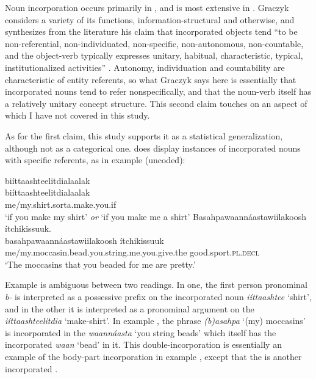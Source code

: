 \documentclass[output=paper]{LSP/langsci}
\begin{document}
Noun incorporation occurs primarily in , and is most extensive in . Graczyk considers a variety of its functions, information-structural and otherwise, and synthesizes from the literature his claim that incorporated objects tend “to be non-referential, non-individuated, non-specific, non-autonomous, non-countable, and the object-verb  typically expresses unitary, habitual, characteristic, typical, institutionalized activities” \citeyearpar[244]{Graczyk1991a}. Autonomy, individuation and countability are characteristic of entity referents, so what Graczyk says here is essentially that incorporated nouns tend to refer nonspecifically, and that the noun-verb  itself has a relatively unitary concept structure. This second claim touches on an aspect of  which I have not covered in this study.

As for the first claim, this study supports it as a statistical generalization, although not as a categorical one.  does display instances of incorporated nouns with specific referents, as in example  (uncoded):

\ea\label{shirtmoccasin}
\ea\label{incorpshirt}
biíttaashteelitdialaalak\footnotemark\\
\gll	biíttaashteelitdialaalak\\
	me/my.shirt.sorta.make.you.if\\
\glt	`if you make my shirt' \emph{or} `if you make me a shirt'
\ex\label{incorpmoccasin}
Basahpawaannáastawiilakoosh ítchikissuuk.\footnotemark\\
\gll	basahpawaannáastawiilakoosh					ítchikissuuk\\
	me/my.moccasin.bead.you.string.me.you.give.the 		good.sport.\textsc{pl.decl}\\
\glt	`The moccasins that you beaded for me are pretty.' 
\z\z

Example  is ambiguous between two readings. In one, the first person pronominal \emph{b-} is interpreted as a possessive prefix on the incorporated noun  \emph{iíttaashtee} `shirt', and in the other it is interpreted as a pronominal argument on the  \emph{iíttaashteelitdia} `make-shirt'. In example , the  phrase \emph{(b)asahpa} `(my) moccasins' is incorporated in the  \emph{waannáasta} `you string beads' which itself has the incorporated \emph{waan} `bead' in it. This double-incorporation is essentially an example of the body-part incorporation in example , except that the  is another incorporated .
\end{document}
